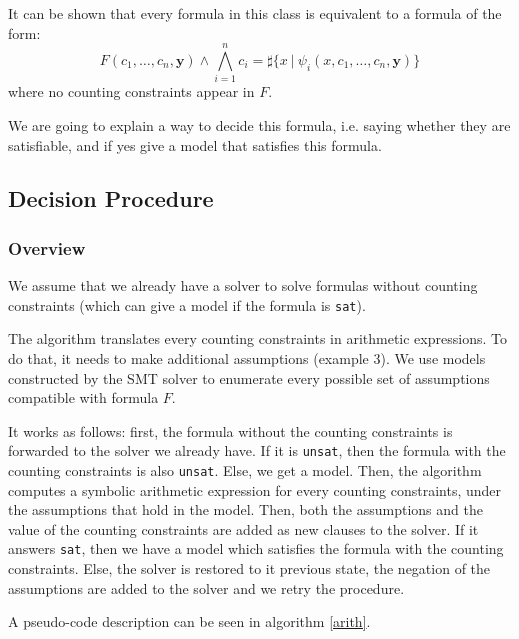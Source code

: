 \documentclass[]{article}
\begin{document}
It can be shown that every formula in this class is equivalent to a formula of the form:
\begin{equation}
F(c_1, \ldots, c_n, \mathbf{y}) \land \bigwedge\limits_{i=1}^n c_i = \sharp\{ x \ |\ \psi_i(x, c_1, \ldots, c_n,
\mathbf{y})\}
\label{maingoal}
\end{equation}
where no counting constraints appear in $F$.

We are going to explain a way to decide this formula, i.e. saying whether
they are satisfiable, and if yes give a model that satisfies this
formula.

\subsection{Decision Procedure}
\subsubsection{Overview}

We assume that we already have a solver to solve formulas without
counting constraints (which can give a model if the formula is
\texttt{sat}).

The algorithm translates every counting constraints in arithmetic expressions. To do that, it needs
to make additional assumptions (example 3). We use models constructed by the SMT solver to enumerate every possible set of
assumptions compatible with formula $F$.

It works as follows: first, the formula without the counting constraints is forwarded to
the solver we already have. If it is \texttt{unsat}, then the formula with the counting constraints is also
\texttt{unsat}. Else, we get a model. Then, the algorithm computes a symbolic arithmetic expression for every counting
constraints, under the assumptions that hold in the model. Then, both the assumptions and the value
of the counting constraints are added as new clauses to the solver. If it answers \texttt{sat}, then we
have a model which satisfies the formula with the counting constraints. Else, the solver is
restored to it previous state, the negation of the assumptions are added to the solver and we
retry the procedure.

A pseudo-code description can be seen in algorithm \ref{arith}.
\end{document}
